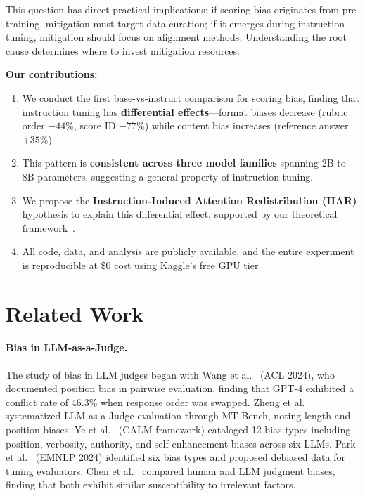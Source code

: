 \documentclass[11pt,twocolumn]{article}
\begin{document}
This question has direct practical implications: if scoring bias originates from pre-training, mitigation must target data curation; if it emerges during instruction tuning, mitigation should focus on alignment methods. Understanding the root cause determines where to invest mitigation resources.

\textbf{Our contributions:}
\begin{enumerate}
    \item We conduct the first base-vs-instruct comparison for scoring bias, finding that instruction tuning has \textbf{differential effects}---format biases decrease (rubric order $-44\%$, score ID $-77\%$) while content bias increases (reference answer $+35\%$).
    \item This pattern is \textbf{consistent across three model families} spanning 2B to 8B parameters, suggesting a general property of instruction tuning.
    \item We propose the \textbf{Instruction-Induced Attention Redistribution (IIAR)} hypothesis to explain this differential effect, supported by our theoretical framework~\cite{monograph2026}.
    \item All code, data, and analysis are publicly available, and the entire experiment is reproducible at \$0 cost using Kaggle's free GPU tier.
\end{enumerate}

\section{Related Work}

\paragraph{Bias in LLM-as-a-Judge.}
The study of bias in LLM judges began with Wang et al.~\cite{wang2023large} (ACL 2024), who documented position bias in pairwise evaluation, finding that GPT-4 exhibited a conflict rate of 46.3\% when response order was swapped. Zheng et al.~\cite{zheng2023judging} systematized LLM-as-a-Judge evaluation through MT-Bench, noting length and position biases. Ye et al.~\cite{ye2024justice} (CALM framework) cataloged 12 bias types including position, verbosity, authority, and self-enhancement biases across six LLMs. Park et al.~\cite{park2024offsetbias} (EMNLP 2024) identified six bias types and proposed debiased data for tuning evaluators. Chen et al.~\cite{chen2024humans} compared human and LLM judgment biases, finding that both exhibit similar susceptibility to irrelevant factors.
\end{document}
